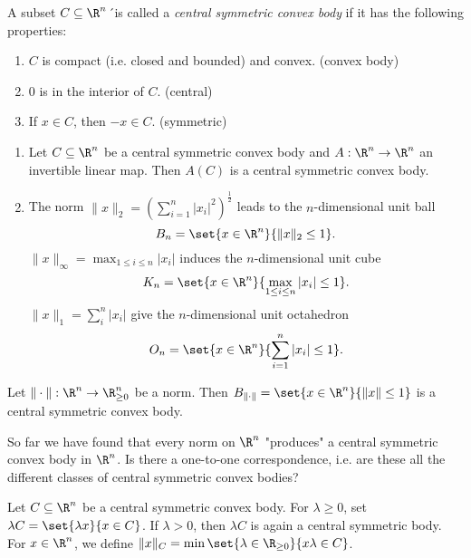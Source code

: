 \begin{defn*}
	A subset \( C \subseteq \R^n \)´is called a \emph{central symmetric convex body} if it has the following properties:
	\begin{enumerate}[label=(\alph*)]
		\item \( C \) is compact (i.e. closed and bounded) and convex. (convex body)
		\item \( 0 \) is in the interior of \( C \). (central)
		\item If \( x \in C \), then \( -x \in C \). (symmetric)
	\end{enumerate}
\end{defn*}

\begin{exmp*}
	\begin{enumerate}
		\item Let \( C \subseteq \R^n \) be a central symmetric convex body and \( A: \R^n \to \R^n \) an invertible linear map.
			Then \( A(C) \) is a central symmetric convex body.
		\item The norm \( \|x\|_2 = \left( \sum_{i=1}^{n} |x_i|^2 \right)^\frac{1}{2} \) leads to the \( n \)-dimensional unit ball
			\[ B_n = \set{x \in \R^n}{\|x\|_2 \leq 1}. \]
			\( \|x\|_\infty = \max_{1 \leq i \leq n}|x_i| \) induces the \( n \)-dimensional unit cube
			\[ K_n = \set{x \in \R^n}{\max_{1 \leq i \leq n} |x_i| \leq 1}. \]
			\( \|x\|_1 = \sum_{i}^{n} |x_i| \) give the \( n \)-dimensional unit octahedron
			\[ O_n = \set{x \in \R^n}{\sum_{i=1}^{n}|x_i| \leq 1}. \]
	\end{enumerate}
\end{exmp*}

\begin{lem}
	Let \( \|\cdot\|: \R^n \to \R^n_{\geq 0} \) be a norm.
	Then \( B_{\|\cdot\|} = \set{x \in \R^n}{\| x \| \leq 1} \) is a central symmetric convex body.
\end{lem}

So far we have found that every norm on \( \R^n \) "produces" a central symmetric convex body in \( \R^n \).
Is there a one-to-one correspondence, i.e. are these all the different classes of central symmetric convex bodies?

\begin{rem*}
	Let \( C \subseteq \R^n \) be a central symmetric convex body.
	For \( \lambda \geq 0 \), set \( \lambda C = \set{\lambda x}{x \in C} \).
	If \( \lambda > 0 \), then \( \lambda C \) is again a central symmetric body.
	For \( x \in \R^n \), we define \( \|x\|_C = \min \set{\lambda \in \R_{\geq 0}}{x \lambda \in C} \).
\end{rem*}

